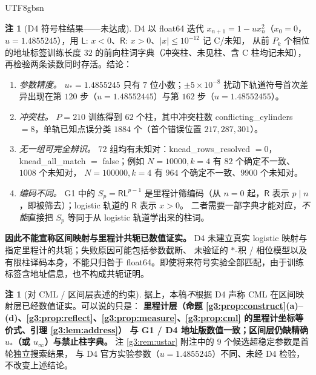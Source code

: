 \documentclass[11pt,a4paper]{article}
\newcommand{\Lsym}{\ensuremath{\mathsf{L}}}
\newcommand{\Rsym}{\ensuremath{\mathsf{R}}}
\newcommand{\ust}{u_{*}}
\newcommand{\uinf}{u_{\infty}}
\theoremstyle{plain}
\theoremstyle{definition}
\newtheorem{rem}[lem]{注}
\begin{document}
\begin{CJK}{UTF8}{gbsn}
\begin{rem}[D4 符号柱结果——未达成]\label{g3:rem:d4knead}
D4 以 float64 迭代 $x_{n+1}=1-ux_n^2$（$x_0=0$，$u=1.4855245$），用 $\Lsym$: $x<0$、$\Rsym$: $x>0$、$|x|\le10^{-12}$ 记 C/未知，
从前 $P_k$ 个相位的地址标签训练长度 $32$ 的前向柱词字典（冲突柱、未见柱、含 C 柱均记未知），再检验两条读数同时存活。结论：
\begin{enumerate}[leftmargin=*,label=(\roman*)]
\item \emph{参数精度。} $\ust=1.4855245$ 只有 $7$ 位小数；$\pm5\times10^{-8}$ 扰动下轨道符号首次差异出现在第 $120$ 步（$u=1.48552445$）与第 $162$ 步（$u=1.48552455$）。
\item \emph{冲突柱。} $P=210$ 训练得到 $62$ 个柱，其中冲突柱数 conflicting\_cylinders $=8$，单轨已知点误分类 $1884$ 个（首个错误位置 $217,287,301$）。
\item \emph{无一组可完全辨识。} $72$ 组均有未知对：knead\_rows\_resolved $=0$，knead\_all\_match $=$ false；例如 $N=10000,k=4$ 有 $82$ 个确定不一致、$1008$ 个未知对，
$N=100000,k=4$ 有 $964$ 个确定不一致、$9900$ 个未知对。
\item \emph{编码不同。} G1 中的 $S_p=\Rsym\Lsym^{p-1}$ 是里程计筛编码（从 $n=0$ 起，$\Rsym$ 表示 $p\mid n$，即被筛去）；logistic 轨道的 $\Rsym$ 表示 $x>0$。
二者需要一部字典才能对应，\emph{不能}直接把 $S_p$ 等同于从 logistic 轨道学出来的柱词。
\end{enumerate}
\textbf{因此不能宣称区间映射与里程计共轭已数值证实。} D4 未建立真实 logistic 映射与指定里程计的共轭；失败原因可能包括参数截断、
未验证的 $*$-积 / 相位模型以及有限柱译码本身，不能只归咎于 float64。即使将来符号实验全部匹配，由于训练标签含地址信息，也不构成共轭证明。
\end{rem}

\begin{rem}[对 CML / 区间层表述的约束]\label{g3:rem:d4cml}
据上，本稿\emph{不}根据 D4 声称 CML 在区间映射层已经数值证实。可以说的只是：
\textbf{里程计层（命题 \ref{g3:prop:construct}(a)--(d)、\ref{g3:prop:reflect}、\ref{g3:prop:measure}、\ref{g3:prop:cml} 的里程计坐标等价式、引理 \ref{g3:lem:address}）
与 G1 / D4 地址版数值一致；区间层仍缺精确 $\ust$（或 $\uinf$）与禁止柱字典。} 注 \ref{g3:rem:ustar} 附注中的 9 个候选超稳定参数是首轮独立搜索结果，
与 D4 官方实验参数（$u=1.4855245$）不同、未经 D4 检验，不改变上述结论。
\end{rem}


\end{CJK}
\end{document}
